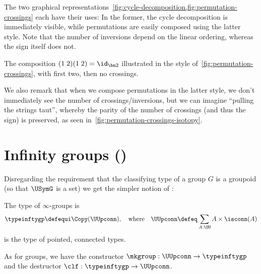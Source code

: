 \begin{remark}
  The two graphical representations~\cref{fig:cycle-decomposition,fig:permutation-crossings}
  each have their uses: In the former, the cycle decomposition is immediately
  visible, while permutations are easily composed using the latter style.
  Note that the number of inversions depend on the linear ordering,
  whereas the sign itself does not.
  \begin{marginfigure}
    \caption{The composition $(1\;2)(1\;2) = \id_{\bn 2}$ illustrated
      in the style of~\cref{fig:permutation-crossings}, with first two, then no
      crossings.}
    \label{fig:permutation-crossings-isotopy}
  \end{marginfigure}
  We also remark that when we compose permutations in the latter style,
  we don't immediately see the number of crossings/inversions, but we can imagine
  ``pulling the strings taut'', whereby the parity of the number of crossings
  (and thus the sign) is preserved, as seen in~\cref{fig:permutation-crossings-isotopy}.
\end{remark}

\section{Infinity groups (\texorpdfstring{\inftygps}{∞-groups})}
\label{sec:inftygps}

Disregarding the requirement that the classifying type
of a group $G$ is a groupoid (so that $\USymG$ is a set)
we get the simpler notion of \inftygps:
\begin{definition}\label{def:inftygps}
  The type of $\infty$-groups is
  \[
    \typeinftygp\defequi \Copy(\UUpconn),
    \quad\text{where}\quad
    \UUpconn\defeq \sum_{A:\UU} A\times \isconn(A)
  \]
  is the type of pointed, connected types.

  As for groups, we have the constructor 
  $\mkgroup : \UUpconn \to \typeinftygp$
  and the destructor $\clf : \typeinftygp \to \UUpconn$.
\end{definition}

